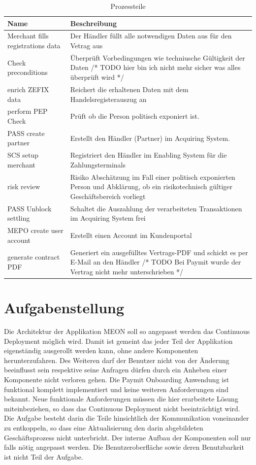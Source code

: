 \begin{table}[H]
	\centering
	\caption{Prozessteile}
	\begin{tabular}{ | p{4cm} | p{12cm} | }
		\toprule
		{\textbf{Name}} & {\textbf{Beschreibung}} \\
		\midrule
		Merchant fills registrations data & Der Händler füllt alle notwendigen Daten aus für den Vetrag aus \\ \hline
		Check preconditions & Überprüft Vorbedingungen wie techniusche Gültigkeit der Daten /* TODO  hier bin ich nicht mehr sicher was alles überprüft wird */ \\ \hline
		enrich ZEFIX data & Reichert die erhaltenen Daten mit dem Handelsregisterauszug an \\ \hline
		perform PEP Check & Prüft ob die Person politisch exponiert ist. \\ \hline
		PASS create partner & Erstellt den Händler (Partner) im Acquiring System.\\ \hline
		SCS setup merchant & Registriert den Händler im Enabling System für die Zahlungsterminals \\ \hline
		risk review  & Risiko Abschätzung im Fall einer politisch exponierten Person und Abklärung, ob ein risikotechnisch gültiger Geschäftsbereich vorliegt \\ \hline
	    PASS Unblock settling & Schaltet die Auszahlung der verarbeiteten Transaktionen im Acquiring System frei \\ \hline
	    MEPO create user account&  Erstellt einen Account im Kundenportal \\ \hline
	    generate contract PDF & Generiert ein ausgefülltes Vertrags-PDF und schickt es per E-Mail an den Händler /* TODO Bei Paymit wurde der Vertrag nicht mehr unterschrieben */  \\
		\bottomrule
	\end{tabular}
\end{table}

\section{Aufgabenstellung}

Die Architektur der Applikation MEON soll so angepasst werden das Continuous Deployment möglich wird. Damit ist gemeint das jeder Teil der Applikation eigenständig ausgerollt werden kann, ohne andere Komponenten herunterzufahren. Des Weiteren darf der Benutzer nicht von der Änderung beeinflusst sein respektive seine Anfragen dürfen durch ein Anheben einer Komponente nicht verloren gehen.
Die Paymit Onboarding Anwendung ist funktional komplett implementiert und keine weiteren Anforderungen sind bekannt. Neue funktionale Anforderungen müssen die hier erarbeitete Lösung miteinbeziehen, so dass das Continuous Deployment nicht beeinträchtigt wird.
Die Aufgabe besteht darin die Teile hinsichtlich der Kommunikation voneinander zu entkoppeln, so dass eine Aktualisierung den darin abgebildeten Geschäftsprozess nicht unterbricht.  Der interne Aufbau der Komponenten soll nur falls nötig angepasst werden. Die Benutzeroberfläche sowie deren Benutzbarkeit ist nicht Teil der Aufgabe.

